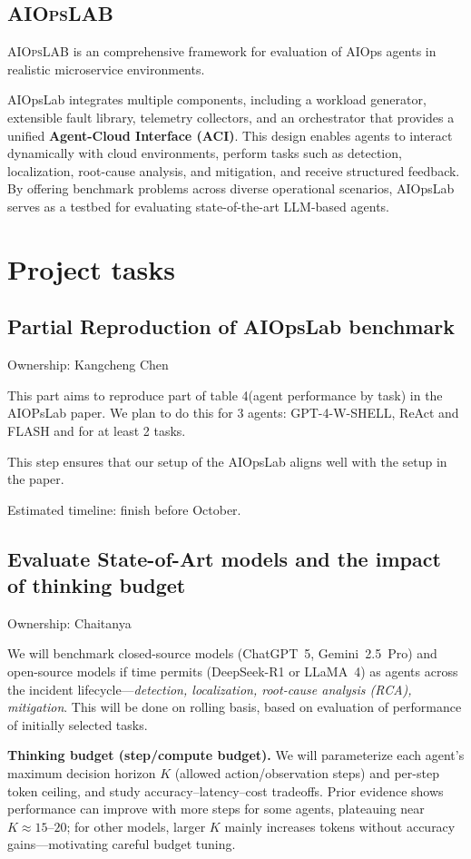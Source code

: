 \documentclass[conference]{IEEEtran}
\begin{document}
\subsection{\textsc{AIOps}LAB}
\textsc{AIOps}LAB\cite{chen2025aiopslab} is an comprehensive framework for evaluation of AIOps agents in realistic microservice environments.  

AIOpsLab integrates multiple components, including a workload generator, extensible fault library, telemetry collectors, and an orchestrator that provides a unified \textbf{Agent-Cloud Interface (ACI)}. This design enables agents to interact dynamically with cloud environments, perform tasks such as detection, localization, root-cause analysis, and mitigation, and receive structured feedback. By offering benchmark problems across diverse operational scenarios, AIOpsLab serves as a testbed for evaluating state-of-the-art LLM-based agents.

\section{Project tasks}
\subsection{Partial Reproduction of AIOpsLab benchmark}
Ownership: Kangcheng Chen

This part aims to reproduce part of table 4(agent performance by task) in the AIOPsLab paper. We plan to do this for 3 agents: GPT-4-W-SHELL, ReAct and FLASH and for at least 2 tasks.

This step ensures that our setup of the AIOpsLab aligns well with the setup in the paper.

Estimated timeline: finish before October. 
\subsection{Evaluate State-of-Art models and the impact of thinking budget}
Ownership: Chaitanya

We will benchmark closed-source models (ChatGPT~5, Gemini~2.5~Pro) and open-source models if time permits (DeepSeek-R1 or LLaMA~4) as agents across the incident lifecycle—\emph{detection, localization, root-cause analysis (RCA), mitigation}. This will be done on rolling basis, based on evaluation of performance of initially selected tasks. 

\textbf{Thinking budget (step/compute budget).} We will parameterize each agent’s maximum decision horizon $K$ (allowed action/observation steps) and per-step token ceiling, and study accuracy–latency–cost tradeoffs. Prior evidence shows performance can improve with more steps for some agents, plateauing near $K\!\approx\!15$–$20$; for other models, larger $K$ mainly increases tokens without accuracy gains—motivating careful budget tuning.
\end{document}
